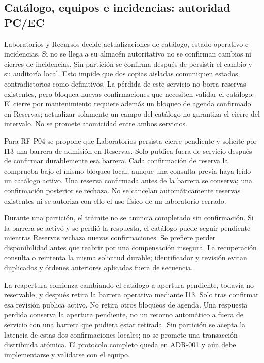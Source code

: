 \subsection{Catálogo, equipos e incidencias: autoridad PC/EC}

Laboratorios y Recursos decide actualizaciones de catálogo, estado operativo e
incidencias. Si no se llega a su almacén autoritativo no se confirman cambios
ni cierres de incidencias. Sin partición se confirma después de persistir el
cambio y su auditoría local. Esto impide que dos copias aisladas comuniquen
estados contradictorios como definitivos. La pérdida de este servicio no borra
reservas existentes, pero bloquea nuevas confirmaciones que necesiten validar
el catálogo. El cierre por mantenimiento requiere además un bloqueo de agenda
confirmado en Reservas; actualizar solamente un campo del catálogo no garantiza
el cierre del intervalo. No se promete atomicidad entre ambos servicios.

Para RF-P04 se propone que Laboratorios persista cierre pendiente y solicite
por I13 una barrera de admisión en Reservas. Solo publica fuera de servicio
después de confirmar durablemente esa barrera. Cada confirmación de reserva
la comprueba bajo el mismo bloqueo local, aunque una consulta previa haya leído
un catálogo activo. Una reserva confirmada antes de la barrera se conserva;
una confirmación posterior se rechaza. No se cancelan automáticamente reservas
existentes ni se autoriza con ello el uso físico de un laboratorio cerrado.

Durante una partición, el trámite no se anuncia completado sin confirmación.
Si la barrera se activó y se perdió la respuesta, el catálogo puede seguir
pendiente mientras Reservas rechaza nuevas confirmaciones. Se prefiere perder
disponibilidad antes que reabrir por una compensación insegura. La recuperación
consulta o reintenta la misma solicitud durable; identificador y revisión
evitan duplicados y órdenes anteriores aplicadas fuera de secuencia.

La reapertura comienza cambiando el catálogo a apertura pendiente, todavía
no reservable, y después retira la barrera operativa mediante I13. Solo tras
confirmar esa revisión publica activo. No retira otros bloqueos de agenda.
Una respuesta perdida conserva la apertura pendiente, no un retorno automático
a fuera de servicio con una barrera que pudiera estar retirada. Sin partición
se acepta la latencia de estas dos confirmaciones locales; no se promete una
transacción distribuida atómica. El protocolo completo queda en ADR-001 y aún
debe implementarse y validarse con el equipo.

